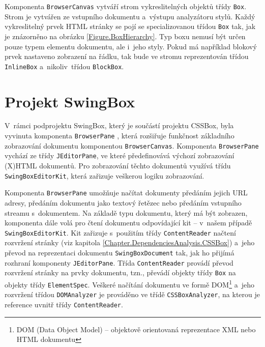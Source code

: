 Komponenta \texttt{BrowserCanvas} vytváří strom vykreslitelných objektů třídy \texttt{Box}. Strom je vytvářen ze vstupního dokumentu a~výstupu analyzátoru stylů. Každý vykreslitelný prvek HTML stránky se pojí se specializovanou třídou \texttt{Box} tak, jak je znázorněno na obrázku \ref{Figure.BoxHierarchy}. Typ boxu nemusí být určen pouze typem elementu dokumentu, ale i~jeho styly. Pokud má například blokový prvek nastaveno zobrazení na řádku, tak bude ve stromu reprezentován třídou \texttt{InlineBox} a~nikoliv~třídou \texttt{BlockBox}. 

\section{Projekt SwingBox}
\label{Chapter.DependenciesAnalysis.SwingBox}

V~rámci podprojektu SwingBox, který je součástí projektu CSSBox, byla vyvinuta komponenta \texttt{BrowserPane} \cite{Bibliography.SwingBox.Thesis}, která rozšiřuje funkčnost základního zobrazování dokumentu komponentou \texttt{BrowserCanvas}. Komponenta \texttt{BrowserPane} vychází ze třídy \texttt{JEditorPane}, ve které předefinovává výchozí zobrazování (X)HTML dokumentů. Pro zobrazování těchto dokumentů využívá třídu \texttt{SwingBoxEditorKit}, která zařizuje veškerou logiku zobrazování.

Komponenta \texttt{BrowserPane} umožňuje načítat dokumenty předáním jejich URL adresy, předáním dokumentu jako textový řetězec nebo předáním vstupního streamu s~dokumentem. Na základě typu dokumentu, který má být zobrazen, komponenta dále volá pro čtení dokumentu odpovídající kit -- v~našem případě \texttt{SwingBoxEditorKit}. Kit zařizuje s~použitím třídy \texttt{ContentReader} načtení rozvržení stránky (viz kapitola \ref{Chapter.DependenciesAnalysis.CSSBox}) a~jeho převod na reprezentaci dokumentu \texttt{SwingBoxDocument} tak, jak ho přijímá rozhraní komponenty \texttt{JEditorPane}. Třída \texttt{ContentReader} provádí převod rozvržení stránky na prvky dokumentu, tzn., převádí objekty třídy \texttt{Box} na objekty třídy \texttt{ElementSpec}. Veškeré načítání dokumentu ve formě DOM\footnote{DOM (Data Object Model) -- objektově orientovaná reprezentace XML nebo HTML dokumentu} a~jeho rozvržení třídou \texttt{DOMAnalyzer} je prováděno ve třídě \texttt{CSSBoxAnalyzer}, na kterou je reference uvnitř třídy \texttt{ContentReader}.

